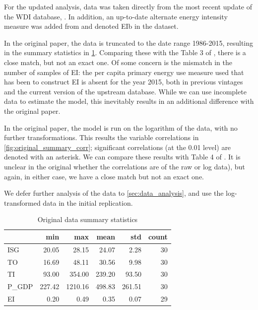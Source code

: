 \documentclass[11pt,a4paper]{article}
\begin{document}
For the updated analysis, data was taken directly from the most recent update of the WDI database, \cite{theworldbankWorldDevelopmentIndicators2019}. In addition, an up-to-date alternate energy intensity measure was added from \cite{enerdataGlobalEnergyStatistical2019} and denoted EIb in the dataset.

In the original paper, the data is truncated to the date range 1986-2015, resulting in the summary statistics in \cref{tab:original_summary_stats}.
Comparing these with the Table 3 of \cite{panHowIndustrializationTrade2019}, there is a close match, but not an exact one.
Of some concern is the mismatch in the number of samples of EI: the per capita primary energy use measure used that has been to construct EI is absent for the year 2015, both in previous vintages and the current version of the upstream database.
While we can use incomplete data to estimate the model, this inevitably results in an additional difference with the original paper.

In the original paper, the model is run on the logarithm of the data, with no further transformations. 
This results the variable correlations in \cref{fig:original_summary_corr}; significant correlations (at the 0.01 level) are denoted with an asterisk.
We can compare these results with Table 4 of \cite{panHowIndustrializationTrade2019}. 
It is unclear in the original whether the correlations are of the raw or log data), but again, in either case, we have a close match but not an exact one.

We defer further analysis of the data to \cref{sec:data_analysis}, and use the log-transformed data in the initial replication.


\begin{table}[tbp]
\centering
\begin{tabular}{lrrrrr}
\toprule
{} &    min &     max &   mean &    std &  count \\
\midrule
ISG   &  20.05 &   28.15 &  24.07 &   2.28 &     30 \\
TO    &  16.69 &   48.11 &  30.56 &   9.98 &     30 \\
TI    &  93.00 &  354.00 & 239.20 &  93.50 &     30 \\
P\_GDP & 227.42 & 1210.16 & 498.83 & 261.51 &     30 \\
EI    &   0.20 &    0.49 &   0.35 &   0.07 &     29 \\
\bottomrule
\end{tabular}
\caption{Original data summary statistics}
\label{tab:original_summary_stats}
\end{table}
\end{document}
